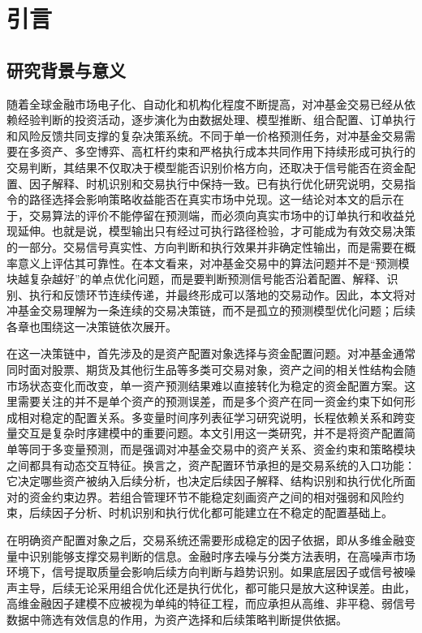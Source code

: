 \chapter{引言}
\section{研究背景与意义}
随着全球金融市场电子化、自动化和机构化程度不断提高，对冲基金交易已经从依赖经验判断的投资活动，逐步演化为由数据处理、模型推断、组合配置、订单执行和风险反馈共同支撑的复杂决策系统。不同于单一价格预测任务，对冲基金交易需要在多资产、多空博弈、高杠杆约束和严格执行成本共同作用下持续形成可执行的交易判断，其结果不仅取决于模型能否识别价格方向，还取决于信号能否在资金配置、因子解释、时机识别和交易执行中保持一致。已有执行优化研究说明，交易指令的路径选择会影响策略收益能否在真实市场中兑现\cite{ning2021double}。这一结论对本文的启示在于，交易算法的评价不能停留在预测端，而必须向真实市场中的订单执行和收益兑现延伸。也就是说，模型输出只有经过可执行路径检验，才可能成为有效交易决策的一部分。交易信号真实性、方向判断和执行效果并非确定性输出，而是需要在概率意义上评估其可靠性\cite{qiao2026probability}。在本文看来，对冲基金交易中的算法问题并不是“预测模块越复杂越好”的单点优化问题，而是要判断预测信号能否沿着配置、解释、识别、执行和反馈环节连续传递，并最终形成可以落地的交易动作。因此，本文将对冲基金交易理解为一条连续的交易决策链，而不是孤立的预测模型优化问题；后续各章也围绕这一决策链依次展开。

在这一决策链中，首先涉及的是资产配置对象选择与资金配置问题。对冲基金通常同时面对股票、期货及其他衍生品等多类可交易对象，资产之间的相关性结构会随市场状态变化而改变，单一资产预测结果难以直接转化为稳定的资金配置方案。这里需要关注的并不是单个资产的预测误差，而是多个资产在同一资金约束下如何形成相对稳定的配置关系。多变量时间序列表征学习研究说明，长程依赖关系和跨变量交互是复杂时序建模中的重要问题\cite{zerveas2021transformer}。本文引用这一类研究，并不是将资产配置简单等同于多变量预测，而是强调对冲基金交易中的资产关系、资金约束和策略模块之间都具有动态交互特征。换言之，资产配置环节承担的是交易系统的入口功能：它决定哪些资产被纳入后续分析，也决定后续因子解释、结构识别和执行优化所面对的资金约束边界。若组合管理环节不能稳定刻画资产之间的相对强弱和风险约束，后续因子分析、时机识别和执行优化都可能建立在不稳定的配置基础上。

在明确资产配置对象之后，交易系统还需要形成稳定的因子依据，即从多维金融变量中识别能够支撑交易判断的信息。金融时序去噪与分类方法表明，在高噪声市场环境下，信号提取质量会影响后续方向判断与趋势识别\cite{liu2024denoising}。如果底层因子或信号被噪声主导，后续无论采用组合优化还是执行优化，都可能只是放大这种误差。由此，高维金融因子建模不应被视为单纯的特征工程，而应承担从高维、非平稳、弱信号数据中筛选有效信息的作用，为资产选择和后续策略判断提供依据。

